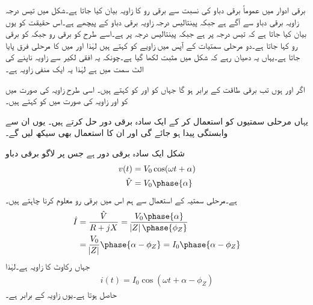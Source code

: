 برقی ادوار میں عموماً برقی دباو  کی نسبت سے  برقی رو   کا زاویہ بیان کیا جاتا ہے۔شکل    میں  تیس درجہ زاویہ برقی دباو سے آگے ہے جبکہ    پینتالیس درجہ زاویہ برقی دباو کے  پیچھے  ہے۔اس حقیقت کو یوں بیان کیا جاتا ہے کہ  تیس درجہ   پر  ہے جبکہ   پینتالیس درجہ   پر ہے۔اسے طرح  کو  برقی رو جبکہ  کو  برقی رو کہا جاتا ہے۔دو مرحلی سمتیات کے آپس میں زاویے کو  کہتے ہیں لہٰذا  اور  میں  کا مرحلی فرق پایا جاتا ہے۔یہاں یہ دھیان رہے کہ شکل میں   مثبت لکھا گیا ہے۔چونکہ یہ افقی لکیر سے زاویہ ناپنے کی الٹ سمت میں ہے لہٰذا یہ ایک منفی زاویہ ہے۔

اگر  اور  ہوں تب برقی طاقت  کے برابر ہو گا جہاں  کو   اور  کو  کہتے ہیں۔ اسی طرح  زاویہ کی صورت میں  کو  اور  زاویہ کی صورت میں  کو  کہتے ہیں۔

یہاں مرحلی سمتیوں کو استعمال کر کے ایک سادہ برقی دور حل کرتے ہیں۔ یوں ان سے وابستگی پیدا ہو جائے گی اور ان کا استعمال بھی سیکھ لیں گے۔

شکل    ایک سادہ   برقی دور ہے جس پر لاگو برقی دباو
\begin{gather}
\begin{aligned}
v(t)&=V_0 \cos (\omega t +\alpha)\\
\hat{V}&=V_0 \phase{\alpha}
\end{aligned}
\end{gather}
ہے۔مرحلی سمتیہ کے استعمال سے ہم اس میں برقی رو  معلوم کرنا چاہتے ہیں۔
\begin{gather}
\begin{aligned}
\hat{I}&=\frac{\hat{V}}{R+j X}=\frac{V_0 \phase{\alpha}}{\abs{Z} \phase {\phi_Z}}\\
&=\frac{V_0}{\abs{Z}} \phase{\alpha-\phi_Z}=I_0 \phase{\alpha-\phi_Z}
\end{aligned}
\end{gather}
جہاں  رکاوٹ کا زاویہ  ہے۔لہٰذا
\begin{align}\label{مساوات_بنیادی_حقائق_دوری_سمتیہ_سے_مزاحمت_امالہ_دور_حل}
i(t)=I_0 \cos (\omega t +\alpha-\phi_Z)
\end{align}
حاصل ہوتا ہے۔یوں  زاویہ  کے برابر ہے۔
